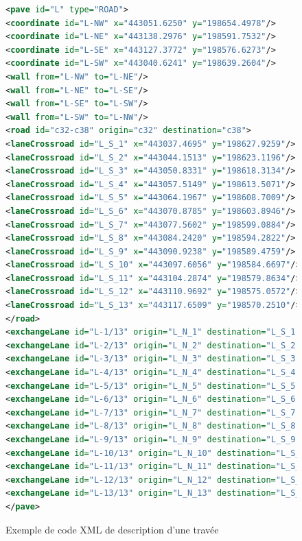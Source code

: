 \begin{figure}[ht]
\centering
 \begin{lstlisting}[language=XML]
<pave id="L" type="ROAD">
<coordinate id="L-NW" x="443051.6250" y="198654.4978"/>
<coordinate id="L-NE" x="443138.2976" y="198591.7532"/>
<coordinate id="L-SE" x="443127.3772" y="198576.6273"/>
<coordinate id="L-SW" x="443040.6241" y="198639.2604"/>
<wall from="L-NW" to="L-NE"/>
<wall from="L-NE" to="L-SE"/>
<wall from="L-SE" to="L-SW"/>
<wall from="L-SW" to="L-NW"/>
<road id="c32-c38" origin="c32" destination="c38">
<laneCrossroad id="L_S_1" x="443037.4695" y="198627.9259"/>
<laneCrossroad id="L_S_2" x="443044.1513" y="198623.1196"/>
<laneCrossroad id="L_S_3" x="443050.8331" y="198618.3134"/>
<laneCrossroad id="L_S_4" x="443057.5149" y="198613.5071"/>
<laneCrossroad id="L_S_5" x="443064.1967" y="198608.7009"/>
<laneCrossroad id="L_S_6" x="443070.8785" y="198603.8946"/>
<laneCrossroad id="L_S_7" x="443077.5602" y="198599.0884"/>
<laneCrossroad id="L_S_8" x="443084.2420" y="198594.2822"/>
<laneCrossroad id="L_S_9" x="443090.9238" y="198589.4759"/>
<laneCrossroad id="L_S_10" x="443097.6056" y="198584.6697"/>
<laneCrossroad id="L_S_11" x="443104.2874" y="198579.8634"/>
<laneCrossroad id="L_S_12" x="443110.9692" y="198575.0572"/>
<laneCrossroad id="L_S_13" x="443117.6509" y="198570.2510"/>
</road>
<exchangeLane id="L-1/13" origin="L_N_1" destination="L_S_1" slots="45*1" in="443054.9578,198652.0845" out="443043.9608,198636.8514"/>
<exchangeLane id="L-2/13" origin="L_N_2" destination="L_S_2" slots="45*1" in="443061.6258,198647.2580" out="443050.6341,198632.0335"/>
<exchangeLane id="L-3/13" origin="L_N_3" destination="L_S_3" slots="45*1" in="443068.2929,198642.4315" out="443057.3074,198627.2155"/>
<exchangeLane id="L-4/13" origin="L_N_4" destination="L_S_4" slots="45*1" in="443074.9600,198637.6050" out="443063.9807,198622.3976"/>
<exchangeLane id="L-5/13" origin="L_N_5" destination="L_S_5" slots="45*1" in="443081.6271,198632.7785" out="443070.6540,198617.5797"/>
<exchangeLane id="L-6/13" origin="L_N_6" destination="L_S_6" slots="45*1" in="443088.2942,198627.9520" out="443077.3273,198612.7617"/>
<exchangeLane id="L-7/13" origin="L_N_7" destination="L_S_7" slots="45*1" in="443094.9613,198623.1255" out="443084.0007,198607.9438"/>
<exchangeLane id="L-8/13" origin="L_N_8" destination="L_S_8" slots="45*1" in="443101.6284,198618.2990" out="443090.6740,198603.1259"/>
<exchangeLane id="L-9/13" origin="L_N_9" destination="L_S_9" slots="45*1" in="443108.2956,198613.4724" out="443097.3473,198598.3080"/>
<exchangeLane id="L-10/13" origin="L_N_10" destination="L_S_10" slots="45*1" in="443114.9627,198608.6459" out="443104.0206,198593.4900"/>
<exchangeLane id="L-11/13" origin="L_N_11" destination="L_S_11" slots="45*1" in="443121.6298,198603.8194" out="443110.6939,198588.6721"/>
<exchangeLane id="L-12/13" origin="L_N_12" destination="L_S_12" slots="45*1" in="443128.2969,198598.9929" out="443117.3672,198583.8542"/>
<exchangeLane id="L-13/13" origin="L_N_13" destination="L_S_13" slots="45*1" in="443134.9640,198594.1664" out="443124.0405,198579.0362"/>
</pave>
\end{lstlisting}
\caption{Exemple de code XML de description d'une travée}
\label{fig:simulation:travee}
\end{figure}

